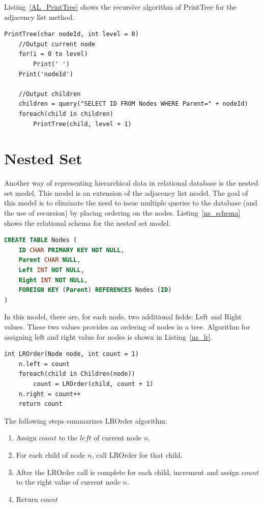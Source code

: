 Listing~\ref{AL_PrintTree} shows the recursive algorithm of PrintTree for the adjacency list method.

\begin{lstlisting}[caption={Algorithm for Member operation},label=AL_PrintTree]
PrintTree(char nodeId, int level = 0)
	//Output current node
	for(i = 0 to level)
		Print(' ')
	Print('nodeId')
	
	//Output children
	children = query("SELECT ID FROM Nodes WHERE Parent=" + nodeId)
	foreach(child in children)
		PrintTree(child, level + 1)
\end{lstlisting}

\section{Nested Set}\label{sec-nested-set}

Another way of representing hierarchical data in relational database is the nested set model\cite{journals/trj/Kamfonas92}. This model is an extension of the adjacency list model. The goal of this model is to eliminate the need to issue multiple queries to the database (and the use of recursion) by placing ordering on the nodes. Listing~\ref{ns_schema} shows the relational schema for the nested set model.

\begin{lstlisting}[language=sql,caption={Nodes table for nested set model},label=ns_schema]
CREATE TABLE Nodes (
    ID CHAR PRIMARY KEY NOT NULL,
    Parent CHAR NULL,
    Left INT NOT NULL,
    Right INT NOT NULL,
    FOREIGN KEY (Parent) REFERENCES Nodes (ID)
)
\end{lstlisting}	

In this model, there are, for each node, two additional fields: Left and Right values. These two values provides an ordering of nodes in a tree. Algorithm for assigning left and right value for nodes is shown in Listing~\ref{ns_lr}.

\begin{lstlisting}[caption={Algorithm for Left-Right value assignment for nested set model},label=ns_lr]
int LROrder(Node node, int count = 1)
	n.left = count
	foreach(child in Children(node))
		count = LROrder(child, count + 1)
	n.right = count++
	return count
\end{lstlisting}

The following steps summarizes LROrder algorithm:

\begin{enumerate}
\item Assign $count$ to the $left$ of current node $n$.
\item For each child of node $n$, call LROrder for that child.
\item After the LROrder call is complete for each child, increment and assign $count$ to the right value of current node $n$.
\item Return $count$
\end{enumerate}

